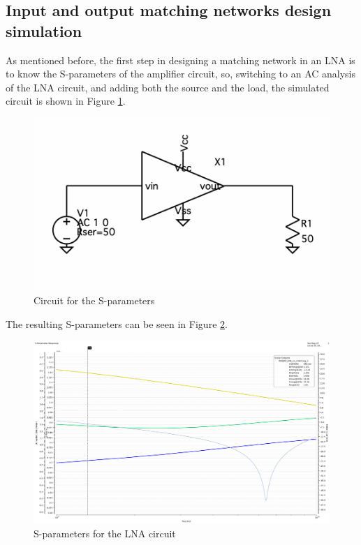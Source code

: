 \subsection{Input and output matching networks design simulation} 

As mentioned before, the first step in designing a matching network in an LNA is to know the S-parameters of the amplifier circuit, so, switching to an AC analysis of the LNA circuit, and adding both the source and the load, the simulated circuit is shown in Figure \ref{fig:SIMS-paramCircuit}.

\begin{figure}[H]
    \centering
    \includegraphics*[scale = 0.5]{Images/S-paramCircuit.png}
    \caption{Circuit for the S-parameters}
    \label{fig:SIMS-paramCircuit}
\end{figure}

The resulting S-parameters can be seen in Figure \ref{fig:SimS-param}.

\begin{figure}[H]
    \centering
    \includegraphics[width=1\textwidth]{Images/s-param-notmatched.png}
    \caption{S-parameters for the LNA circuit}
    \label{fig:SimS-param}
\end{figure}


